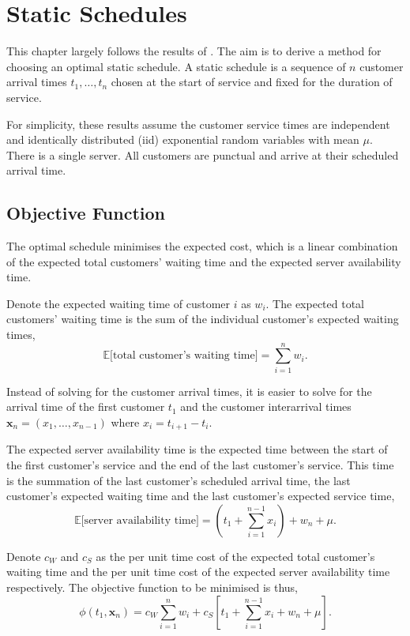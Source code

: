 \chapter{Static Schedules}
\label{chap:Static}
This chapter largely follows the results of \citet{Pegden}. The aim is to derive a method for choosing an optimal static schedule. A static schedule is a sequence of $n$ customer arrival times $t_{1}, \ldots, t_{n}$ chosen at the start of service and fixed for the duration of service. 

For simplicity, these results assume the customer service times are independent and identically distributed (iid) exponential random variables with mean $\mu$. There is a single server. All customers are punctual and arrive at their scheduled arrival time.

\section{Objective Function}
The optimal schedule minimises the expected cost, which is a linear combination of the expected total customers' waiting time and the expected server availability time.

Denote the expected waiting time of customer $i$ as $w_{i}$. The expected total customers' waiting time is the sum of the individual customer's expected waiting times,
\begin{equation}
	\mathbb{E} \Big[\text{total customer's waiting time} \Big] = \sum_{i = 1}^{n} w_{i}.
\end{equation}

Instead of solving for the customer arrival times, it is easier to solve for the arrival time of the first customer $t_{1}$ and the customer interarrival times $\mathbf{x}_{n} = (x_{1}, \ldots, x_{n - 1})$ where $x_{i} = t_{i + 1} - t_{i}$.

The expected server availability time is the expected time between the start of the first customer's service and the end of the last customer's service. This time is the summation of the last customer's scheduled arrival time, the last customer's expected waiting time and the last customer's expected service time,
\begin{equation}
	\mathbb{E} \Big[\text{server availability time} \Big] = \left( t_{1} + \sum_{i = 1}^{n - 1} x_{i} \right) + w_{n} + \mu.
\end{equation}

Denote $c_{W}$ and $c_{S}$ as the per unit time cost of the expected total customer's waiting time and the per unit time cost of the expected server availability time respectively. The objective function to be minimised is thus,
\begin{equation}
	\phi (t_{1}, \mathbf{x}_{n}) = c_{W} \sum_{i = 1}^{n} w_{i} + c_{S} \left[ t_{1} + \sum_{i = 1}^{n - 1} x_{i} + w_{n} + \mu \right].
\end{equation}

